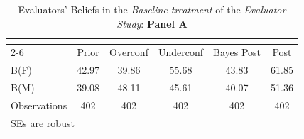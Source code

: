 \begin{table}[htbp]\centering
\caption{Evaluators' Beliefs in the \textit{Baseline treatment} of the \textit{Evaluator Study}: \textbf{Panel A}}
\begin{tabular}{l*{5}{c}}
\hline\hline
                &\multicolumn{5}{c}{}                             \\\cmidrule(lr){2-6}
                &\multicolumn{1}{c}{Prior}&\multicolumn{1}{c}{Overconf}&\multicolumn{1}{c}{Underconf}&\multicolumn{1}{c}{Bayes Post}&\multicolumn{1}{c}{Post}\\
\hline
B(F)            &    42.97&    39.86&    55.68&    43.83&    61.85\\
B(M)            &    39.08&    48.11&    45.61&    40.07&    51.36\\
\hline
Observations    &      402&      402&      402&      402&      402\\
\hline\hline
\multicolumn{6}{l}{\footnotesize SEs are robust}\\
\end{tabular}
\end{table}
